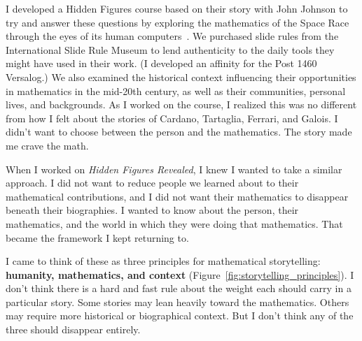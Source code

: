 \documentclass[pdflatex,sn-mathphys-num]{sn-jnl}%
\begin{document}
I developed a Hidden Figures course based on their story with John Johnson to try and answer these questions by exploring the mathematics of the Space Race through the eyes of its human computers~\cite{osu2019hiddenfigures, edmonds2021intersections}. We purchased slide rules from the International Slide Rule Museum to lend authenticity to the daily tools they might have used in their work. (I developed an affinity for the Post 1460 Versalog.) We also examined the historical context influencing their opportunities in mathematics in the mid-20th century, as well as their communities, personal lives, and backgrounds. 
As I worked on the course, I realized this was no different from how I felt about the stories of Cardano, Tartaglia, Ferrari, and Galois. I didn't want to choose between the person and the mathematics. The story made me crave the math.

When I worked on \emph{Hidden Figures Revealed}, I knew I wanted to take a similar approach. I did not want to reduce people we learned about to their mathematical contributions, and I did not want their mathematics to disappear beneath their biographies. I wanted to know about the person, their mathematics, and the world in which they were doing that mathematics. That became the framework I kept returning to. 

I came to think of these as three principles for mathematical storytelling: \textbf{humanity, mathematics, and context} (Figure~\ref{fig:storytelling_principles}). I don't think there is a hard and fast rule about the weight each should carry in a particular story. Some stories may lean heavily toward the mathematics. Others may require more historical or biographical context. But I don't think any of the three should disappear entirely.
\end{document}
